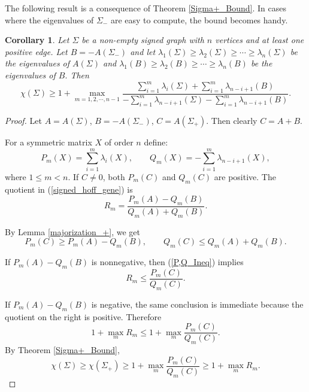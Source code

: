 \documentclass[12pt]{article}
\theoremstyle{plain}
\newtheorem{theorem}{Theorem}[section]
\newtheorem{corollary}[theorem]{Corollary}
\numberwithin{equation}{section}
\begin{document}
	The following result is a consequence of Theorem \ref{Sigma+_Bound}. In cases where the eigenvalues of $\Sigma_-$ are easy to compute, the bound becomes handy. 
	
	\begin{corollary}\label{Chroma_Treom}
		Let $\Sigma$ be a non-empty signed graph with $n$ vertices and at least one positive edge. Let $B=-A(\Sigma_-)$ and let $\lambda_{1}(\Sigma)\geq\lambda_{2}(\Sigma)\geq \cdots \geq \lambda_{n}(\Sigma) $ be the eigenvalues of $A(\Sigma)$ and $\lambda_{1}(B)\geq\lambda_{2}(B)\geq \cdots \geq \lambda_{n}(B) $ be the eigenvalues of $B.$ Then \begin{equation}\label{signed_hoff_gene}
			\chi(\Sigma)\geq 1+ \max_{m=1, 2, \cdots, n-1} \frac{\sum_{i=1}^{m}\lambda_{i}(\Sigma)+\sum_{i=1}^{m}\lambda_{n-i+1}(B)}{-\sum_{i=1}^{m}\lambda_{n-i+1}(\Sigma)-\sum_{i=1}^{m}\lambda_{n-i+1}(B)}.
		\end{equation} 
	\end{corollary}
	\begin{proof}
		Let $A= A(\Sigma)$, $B=-A(\Sigma_-)$, $C=A(\Sigma_+)$. Then clearly $C=A+B$.
		
		
		
		For a symmetric matrix $X$ of order $n$ define:
		\[
		P_m(X)=\sum_{i=1}^{m}\lambda_i(X),
		\qquad
		Q_m(X)=
		-\sum_{i=1}^{m}\lambda_{n-i+1}(X),
		\]
		where $1 \leq m < n.$ If $C\neq 0$, both $P_m(C)$ and $Q_m(C)$ are positive. The quotient in
		(\ref{signed_hoff_gene}) is
		\[
		R_m=
		\frac{P_m(A)-Q_m(B)}
		{Q_m(A)+Q_m(B)}.
		\]
		
		By Lemma \ref{majorization_+}, we get
		\begin{equation}\label{P,Q_Ineq}
			P_m(C)\geq P_m(A)-Q_m(B),
			\qquad
			Q_m(C)\leq Q_m(A)+Q_m(B).
		\end{equation}
		
		If $P_m(A)-Q_m(B)$ is nonnegative, then (\ref{P,Q_Ineq}) implies
		\[
		R_m\leq
		\frac{P_m(C)}
		{Q_m(C)}.
		\]
		
		If $P_m(A)-Q_m(B)$ is negative, the same conclusion is immediate because
		the quotient on the right is positive. Therefore
		\[
		1+\max_m R_m
		\leq
		1+\max_m
		\frac{P_m(C)}
		{Q_m(C)}.
		\]
		By Theorem \ref{Sigma+_Bound},
		$$\chi(\Sigma) \geq \chi(\Sigma_+) \geq 1+\max_m
		\frac{P_m(C)}
		{Q_m(C)} \geq 1+ \max_m R_m
		.
		$$
		
	\end{proof}
\end{document}

